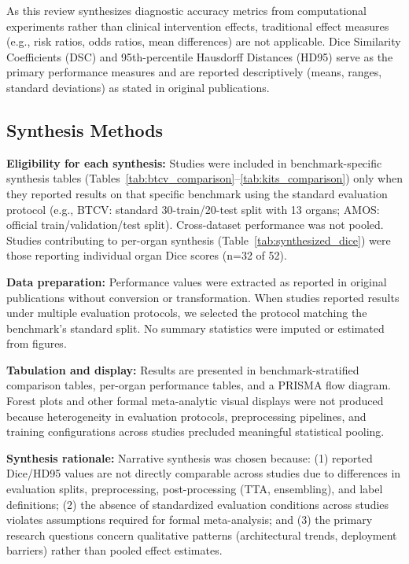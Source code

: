 \documentclass[conference]{IEEEtran}
\begin{document}
As this review synthesizes diagnostic accuracy metrics from computational experiments rather than clinical intervention effects, traditional effect measures (e.g., risk ratios, odds ratios, mean differences) are not applicable. Dice Similarity Coefficients (DSC) and 95th-percentile Hausdorff Distances (HD95) serve as the primary performance measures and are reported descriptively (means, ranges, standard deviations) as stated in original publications.

\subsection{Synthesis Methods}

\textbf{Eligibility for each synthesis:} Studies were included in benchmark-specific synthesis tables (Tables~\ref{tab:btcv_comparison}--\ref{tab:kits_comparison}) only when they reported results on that specific benchmark using the standard evaluation protocol (e.g., BTCV: standard 30-train/20-test split with 13 organs; AMOS: official train/validation/test split). Cross-dataset performance was not pooled. Studies contributing to per-organ synthesis (Table~\ref{tab:synthesized_dice}) were those reporting individual organ Dice scores (n=32 of 52).

\textbf{Data preparation:} Performance values were extracted as reported in original publications without conversion or transformation. When studies reported results under multiple evaluation protocols, we selected the protocol matching the benchmark's standard split. No summary statistics were imputed or estimated from figures.

\textbf{Tabulation and display:} Results are presented in benchmark-stratified comparison tables, per-organ performance tables, and a PRISMA flow diagram. Forest plots and other formal meta-analytic visual displays were not produced because heterogeneity in evaluation protocols, preprocessing pipelines, and training configurations across studies precluded meaningful statistical pooling.

\textbf{Synthesis rationale:} Narrative synthesis was chosen because: (1) reported Dice/HD95 values are not directly comparable across studies due to differences in evaluation splits, preprocessing, post-processing (TTA, ensembling), and label definitions; (2) the absence of standardized evaluation conditions across studies violates assumptions required for formal meta-analysis; and (3) the primary research questions concern qualitative patterns (architectural trends, deployment barriers) rather than pooled effect estimates.
\end{document}
